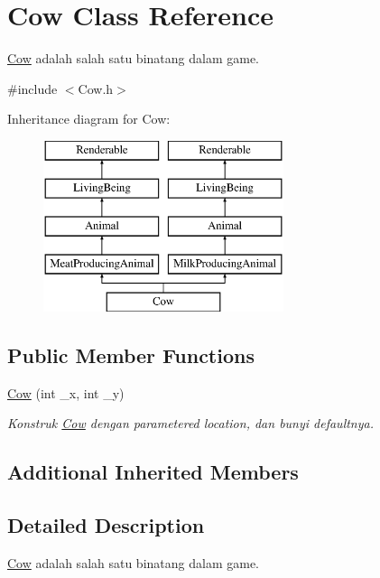 \hypertarget{classCow}{}\section{Cow Class Reference}
\label{classCow}


\mbox{\hyperlink{classCow}{Cow}} adalah salah satu binatang dalam game.  




{\ttfamily \#include $<$Cow.\+h$>$}

Inheritance diagram for Cow\+:\begin{figure}[H]
\begin{center}
\leavevmode
\includegraphics[height=5.000000cm]{classCow}
\end{center}
\end{figure}
\subsection*{Public Member Functions}
\begin{DoxyCompactItemize}
\item 
\mbox{\hyperlink{classCow_a8d004e3d53acceb83ac4321f972fc78b}{Cow}} (int \+\_\+x, int \+\_\+y)
\begin{DoxyCompactList}\small\item\em Konstruk \mbox{\hyperlink{classCow}{Cow}} dengan parametered location, dan bunyi defaultnya. \end{DoxyCompactList}\end{DoxyCompactItemize}
\subsection*{Additional Inherited Members}


\subsection{Detailed Description}
\mbox{\hyperlink{classCow}{Cow}} adalah salah satu binatang dalam game. 

